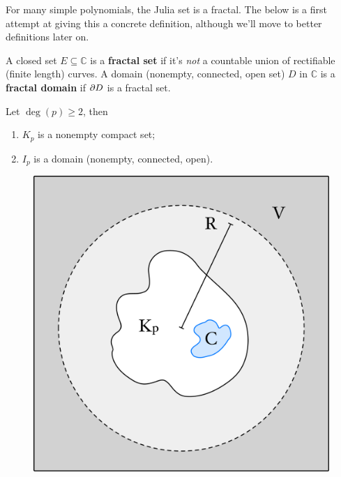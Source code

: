 \documentclass[twoside,10pt]{report}
\begin{document}
For many simple polynomials, the Julia set is a fractal. The below is a first attempt at giving this a concrete definition, although we'll move to better definitions later on.

\begin{defn}[]
A closed set $E \subseteq \mathbb{C}$ is a \textbf{fractal set} if it's \textit{not} a countable union of rectifiable (finite length) curves. A domain (nonempty, connected, open set) $D$ in $\mathbb{C}$ is a \textbf{fractal domain} if $\partial D$ is a fractal set.
\end{defn}


\begin{thrm}[]
Let $\deg(p) \geq 2$, then
\begin{enumerate}
	\item $K_{p}$ is a nonempty compact set;
	\item $I_{p}$ is a domain (nonempty, connected, open).
\end{enumerate}
\end{thrm}
\begin{figure}[H]
	\centering
	\includegraphics[scale=.1]{fig/julia_connected.pdf}
\end{figure}
\end{document}
